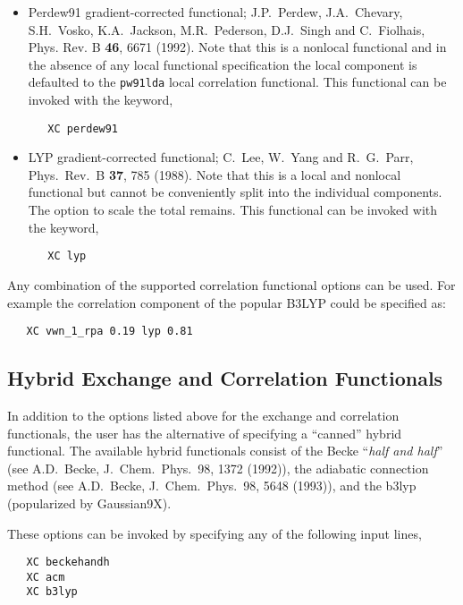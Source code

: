 \begin{itemize}
\item Perdew91 gradient-corrected functional;  J.P.~Perdew,
  J.A.~Chevary, S.H.~Vosko, K.A.~Jackson, M.R.~Pederson, D.J.~Singh
  and C.~Fiolhais, Phys. Rev. B {\bf 46}, 6671 (1992). Note that this
  is a nonlocal functional and in the absence of any local functional 
  specification the local component is defaulted to the \verb+pw91lda+ local 
  correlation functional.  This functional can be invoked with the keyword,
\begin{verbatim}
   XC perdew91
\end{verbatim}

\item LYP gradient-corrected functional; C.~Lee, W.~Yang and
   R.~G.~Parr, Phys.~Rev.~B {\bf 37}, 785 (1988).  Note that this
  is a local and nonlocal functional but cannot be conveniently split
  into the individual components.  The option to scale the total remains.
  This functional can be invoked with the keyword,
\begin{verbatim}
   XC lyp
\end{verbatim}

\end{itemize}

\fussy

Any combination of the supported correlation functional options can be
used.  For example the correlation component of the popular B3LYP
could be specified as:
\begin{verbatim}
   XC vwn_1_rpa 0.19 lyp 0.81
\end{verbatim}

  
\subsection{Hybrid Exchange and Correlation Functionals}

In addition to the options listed above for the exchange and correlation
functionals, the user has the alternative of specifying a ``canned'' hybrid
functional.  The available hybrid functionals consist of the Becke
``{\sl half and half}'' (see A.D.~Becke, J.~Chem.~Phys.~98, 1372 (1992)), the
adiabatic connection method (see A.D.~Becke, J.~Chem.~Phys.~98, 5648
(1993)), and the b3lyp (popularized by Gaussian9X).

These options can be invoked by specifying any of the following input lines,
\begin{verbatim}
   XC beckehandh
   XC acm
   XC b3lyp
\end{verbatim}

